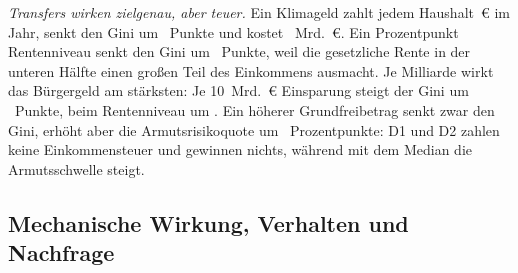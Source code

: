 \emph{Transfers wirken zielgenau, aber teuer.} Ein Klimageld zahlt jedem
Haushalt \,\euro{} im Jahr, senkt den Gini um
~Punkte und kostet
~Mrd.~\euro. Ein Prozentpunkt Rentenniveau
senkt den Gini um ~Punkte, weil die gesetzliche
Rente in der unteren Hälfte einen großen Teil des Einkommens ausmacht. Je
Milliarde wirkt das Bürgergeld am stärksten: Je 10~Mrd.~\euro{} Einsparung steigt
der Gini um ~Punkte, beim Rentenniveau um
. Ein höherer Grundfreibetrag senkt zwar den Gini,
erhöht aber die Armutsrisikoquote um ~Prozentpunkte:
D1 und D2 zahlen keine Einkommensteuer und gewinnen nichts, während mit dem
Median die Armutsschwelle steigt.

\begin{table}[tbp]
\centering\scriptsize
\setlength{\tabcolsep}{2.8pt}
\caption{Gesamtmatrix der Wirkungen je Schritt: erste Periode (Jahreswerte
2025--2028) und Ende des Pfads, Schuldenquote und BIP-Niveau zu Beginn der
letzten Periode (2041), Emissionen 2025--2040 kumuliert; die Stellgröße bleibt
über alle Perioden verschoben.
\textcolor{pos}{Blau}: erwünschte Richtung, \textcolor{neg}{orange}: unerwünschte,
Sättigung nach Betrag relativ zum größten Wert der Spalte; grau: keine messbare
Wirkung. Gini in Punkten (1~Punkt = 0,01), Nettoeinkommen je Haushalt und Jahr,
BIP-Niveau zu Beginn der letzten Periode ohne deren Nachfrage.}
\label{tab:gesamt}

\end{table}

\begin{table}[tbp]
\centering\footnotesize
\caption{Preis einer Milliarde Konsolidierung. Jede Stellgröße in der Richtung,
die den Saldo verbessert; $\Delta$Saldo in der ersten Periode, Änderung des
Gini-Koeffizienten je 10~Mrd.~\euro{} Saldoverbesserung, Änderung des BIP je
Mrd.~\euro{} Saldoverbesserung in der ersten Periode und des BIP-Niveaus 2041
je Mrd.~\euro{} Saldoverbesserung in der letzten. Geordnet vom progressivsten zum
regressivsten Instrument.}
\label{tab:preise}

\end{table}

\subsection{Mechanische Wirkung, Verhalten und Nachfrage}
\label{sec:zerlegung}

